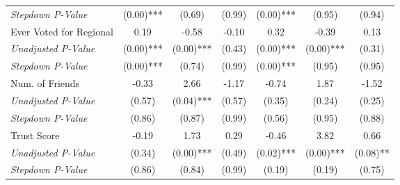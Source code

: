\begin{tabular}{l c c c c c c}
\quad \textit{Stepdown P-Value} & (0.00)*** & (0.69) & (0.99) & (0.00)*** & (0.95) & (0.94) \\
Ever Voted for Regional & 0.19 & -0.58 & -0.10 & 0.32 & -0.39 & 0.13 \\
\quad \textit{Unadjusted P-Value} & (0.00)*** & (0.00)*** & (0.43) & (0.00)*** & (0.00)*** & (0.31) \\
\quad \textit{Stepdown P-Value} & (0.00)*** & (0.74) & (0.99) & (0.00)*** & (0.95) & (0.95) \\
Num. of Friends & -0.33 & 2.66 & -1.17 & -0.74 & 1.87 & -1.52 \\
\quad \textit{Unadjusted P-Value} & (0.57) & (0.04)*** & (0.57) & (0.35) & (0.24) & (0.25) \\
\quad \textit{Stepdown P-Value} & (0.86) & (0.87) & (0.99) & (0.56) & (0.95) & (0.88) \\
Trust Score & -0.19 & 1.73 & 0.29 & -0.46 & 3.82 & 0.66 \\
\quad \textit{Unadjusted P-Value} & (0.34) & (0.00)*** & (0.49) & (0.02)*** & (0.00)*** & (0.08)** \\
\quad \textit{Stepdown P-Value} & (0.86) & (0.84) & (0.99) & (0.19) & (0.19) & (0.75) \\
\bottomrule
\end{tabular}

